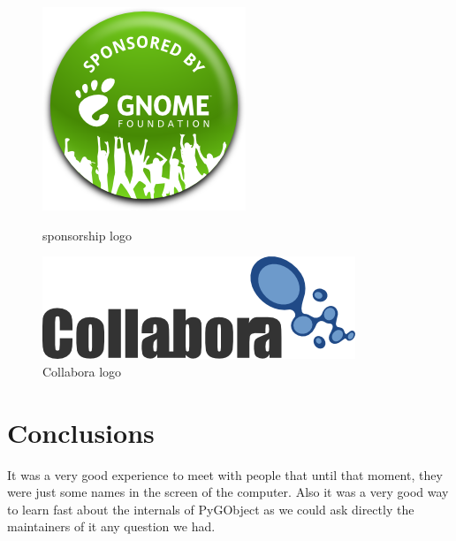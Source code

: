 \begin{figure}[H]
  \begin{minipage}[b]{0.5\linewidth}
    \centering
    \includegraphics[scale=0.45]{./images/sponsored-badge-shadow}
    \caption{\GNOME sponsorship logo}
  \end{minipage}
  \hspace{0.5cm}
  \begin{minipage}[b]{0.5\linewidth}
    \centering
    \includegraphics[scale=0.45]{./images/collabora-logo-small}
    \caption{Collabora logo}
  \end{minipage}
\end{figure}

\section{Conclusions}

It was a very good experience to meet with people that until that moment, they were just some names in the screen of the computer. Also it was a very good way to learn fast about the internals of PyGObject as we could ask directly the maintainers of it any question we had.
